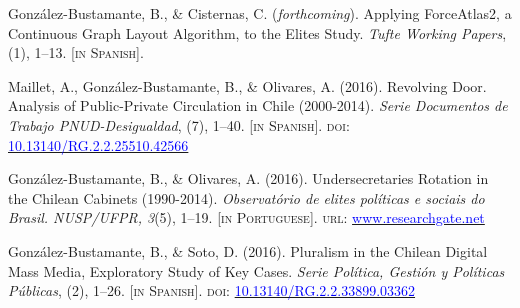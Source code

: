 





\begin{publications}

\begin{benumerate}{4}

\item{\small Gonz\'alez-Bustamante, B., \& Cisternas, C. ({\itshape forthcoming}).  Applying ForceAtlas2, a Continuous Graph Layout Algorithm, to the Elites Study. {\itshape Tufte Working Papers}, (1), 1--13. {\footnotesize \scshape [in Spanish]}.} \vspace{1mm}

\item{\small Maillet, A., Gonz\'alez-Bustamante, B., \& Olivares, A. (2016). Revolving Door. Analysis of Public-Private Circulation in Chile (2000-2014). {\itshape Serie Documentos de Trabajo PNUD-Desigualdad}, (7), 1--40. {\footnotesize \scshape [in Spanish]}. {\scshape doi}: \href{http://doi.org/10.13140/RG.2.2.25510.42566}{\textcolor{blue}{10.13140/RG.2.2.25510.42566}}} \vspace{1mm}

\item{\small Gonz\'alez-Bustamante, B., \& Olivares, A. (2016). Undersecretaries Rotation in the Chilean Cabinets (1990-2014). {\itshape Observat\'orio de elites pol\'iticas e sociais do Brasil. NUSP/UFPR, 3}(5), 1--19. {\footnotesize \scshape [in Portuguese]}. {\scshape url}: \href{https://www.researchgate.net/publication/321993740_A_rotatividade_de_subsecretarios_dos_ministerios_no_Chile_1990-2014}{\textcolor{blue}{www.researchgate.net}}} \vspace{1mm}

\item{\small Gonz\'alez-Bustamante, B., \& Soto, D. (2016). Pluralism in the Chilean Digital Mass Media, Exploratory Study of Key Cases. {\itshape Serie Pol\'itica, Gesti\'on y Pol\'iticas P\'ublicas}, (2), 1--26. {\footnotesize \scshape [in Spanish]}. {\scshape doi}: \href{http://doi.org/10.13140/RG.2.2.33899.03362}{\textcolor{blue}{10.13140/RG.2.2.33899.03362}}}
\end{benumerate}

\end{publications}
